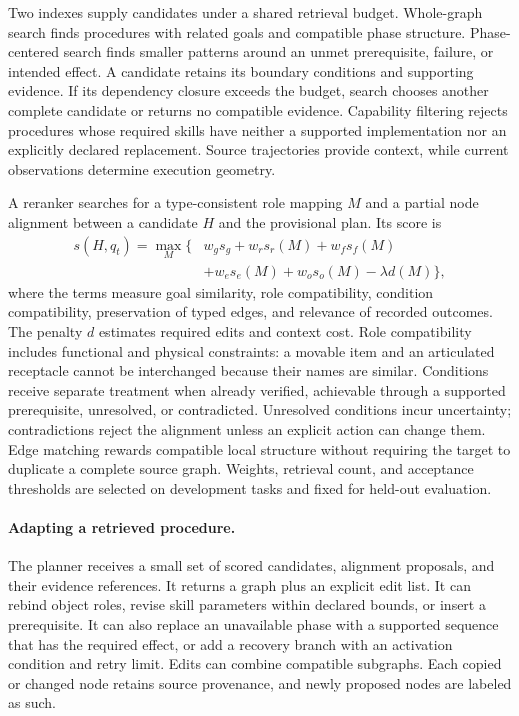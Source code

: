 Two indexes supply candidates under a shared retrieval budget. Whole-graph search finds procedures with related goals and compatible phase structure. Phase-centered search finds smaller patterns around an unmet prerequisite, failure, or intended effect. A candidate retains its boundary conditions and supporting evidence. If its dependency closure exceeds the budget, search chooses another complete candidate or returns no compatible evidence. Capability filtering rejects procedures whose required skills have neither a supported implementation nor an explicitly declared replacement. Source trajectories provide context, while current observations determine execution geometry.

A reranker searches for a type-consistent role mapping $M$ and a partial node alignment between a candidate $H$ and the provisional plan. Its score is
\begin{equation}
\begin{split}
s(H,q_t)=\max_M\{&w_g s_g+w_r s_r(M)+w_f s_f(M)\\
                &+w_e s_e(M)+w_o s_o(M)-\lambda d(M)\},
\end{split}
\label{eq:alignment-score}
\end{equation}
where the terms measure goal similarity, role compatibility, condition compatibility, preservation of typed edges, and relevance of recorded outcomes. The penalty $d$ estimates required edits and context cost. Role compatibility includes functional and physical constraints: a movable item and an articulated receptacle cannot be interchanged because their names are similar. Conditions receive separate treatment when already verified, achievable through a supported prerequisite, unresolved, or contradicted. Unresolved conditions incur uncertainty; contradictions reject the alignment unless an explicit action can change them. Edge matching rewards compatible local structure without requiring the target to duplicate a complete source graph. Weights, retrieval count, and acceptance thresholds are selected on development tasks and fixed for held-out evaluation.

\paragraph{Adapting a retrieved procedure.}
The planner receives a small set of scored candidates, alignment proposals, and their evidence references. It returns a graph plus an explicit edit list. It can rebind object roles, revise skill parameters within declared bounds, or insert a prerequisite. It can also replace an unavailable phase with a supported sequence that has the required effect, or add a recovery branch with an activation condition and retry limit. Edits can combine compatible subgraphs. Each copied or changed node retains source provenance, and newly proposed nodes are labeled as such.


